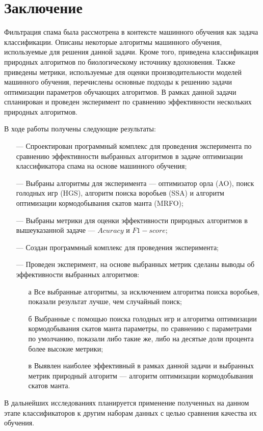 \chapter*{Заключение}

Фильтрация спама была рассмотрена в контексте машинного обучения как задача
классификации. Описаны некоторые алгоритмы машинного обучения, используемые 
для решения данной задачи. Кроме того, приведена классификация природных алгоритмов 
по биологическому источнику вдохновения.
Также приведены метрики, используемые для оценки производительности
моделей машинного обучения, перечислены основные подходы к решению задачи оптимизации параметров
обучающих алгоритмов. В рамках данной задачи спланирован и проведен эксперимент по сравнению 
эффективности нескольких природных алгоритмов.

В ходе работы получены следующие результаты:
\begin{itemize}
    \item[—] Спроектирован программный комплекс для проведения эксперимента по сравнению эффективности 
        выбранных алгоритмов в задаче оптимизации классификатора спама на основе машинного обучения;
    \item[—] Выбраны алгоритмы для эксперимента — оптимизатор орла (AO), поиск голодных игр (HGS), алгоритм поиска 
        воробьев (SSA) и алгоритм оптимизации кормодобывания скатов манта (MRFO);
    \item[—] Выбраны метрики для оценки эффективности природных алгоритмов в 
        вышеуказанной задаче — $Acuracy$ и $F1-score$; 
    \item[—] Создан программный комплекс для проведения эксперимента;
    \item[—] Проведен эксперимент, на основе выбранных метрик сделаны выводы об 
    эффективности выбранных алгоритмов:
        \begin{itemize}
            \item[а] Все выбранные алгоритмы, за исключением алгоритма поиска 
            воробьев, показали результат лучше, чем случайный поиск;
            \item[б] Выбранные с помощью поиска голодных игр и алгоритма оптимизации кормодобывания 
            скатов манта параметры, по сравнению с параметрами по умолчанию, показали 
            либо такие же, либо на десятые доли процента более высокие метрики;
            \item[в] Выявлен наиболее эффективный в рамках данной задачи и выбранных метрик природный алгоритм — 
            алгоритм оптимизации кормодобывания скатов манта.
        \end{itemize}
\end{itemize}

В дальнейших исследованиях планируется применение полученных на данном этапе классификаторов к 
другим наборам данных с целью сравнения качества их обучения.


